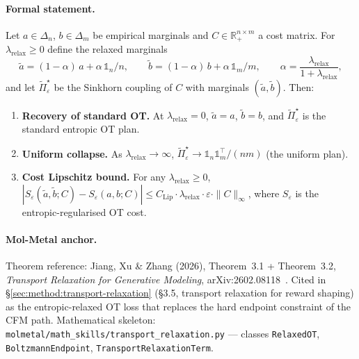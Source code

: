 \paragraph{Formal statement.}
\begin{theorem}
\label{thm:T2-transport-relax}
Let $a \in \Delta_n$, $b \in \Delta_m$ be empirical marginals and
$C \in \mathbb{R}^{n \times m}_{+}$ a cost matrix.  For
$\lambda_{\mathrm{relax}} \geq 0$ define the relaxed marginals
\[
  \tilde a = (1 - \alpha) \, a + \alpha \, \mathbb{1}_n / n, \qquad
  \tilde b = (1 - \alpha) \, b + \alpha \, \mathbb{1}_m / m, \qquad
  \alpha = \frac{\lambda_{\mathrm{relax}}}{1 + \lambda_{\mathrm{relax}}},
\]
and let $\tilde \Pi^{\star}_{\varepsilon}$ be the Sinkhorn coupling
of $C$ with marginals $(\tilde a, \tilde b)$.  Then:
\begin{enumerate}
  \item[(i)] \textbf{Recovery of standard OT.}  At
    $\lambda_{\mathrm{relax}} = 0$, $\tilde a = a$, $\tilde b = b$,
    and $\tilde \Pi^{\star}_{\varepsilon}$ is the standard
    entropic OT plan.
  \item[(ii)] \textbf{Uniform collapse.}  As
    $\lambda_{\mathrm{relax}} \to \infty$, $\tilde \Pi^{\star}_{\varepsilon}
    \to \mathbb{1}_n \mathbb{1}_m^{\top} / (n m)$ (the uniform plan).
  \item[(iii)] \textbf{Cost Lipschitz bound.}  For any
    $\lambda_{\mathrm{relax}} \geq 0$,
    $|S_\varepsilon(\tilde a, \tilde b; C) - S_\varepsilon(a, b; C)|
      \le C_{\mathrm{Lip}} \cdot \lambda_{\mathrm{relax}} \cdot
      \varepsilon \cdot \|C\|_{\infty}$,
    where $S_\varepsilon$ is the entropic-regularised OT cost.
\end{enumerate}
\end{theorem}

\paragraph{Mol-Metal anchor.}
Theorem reference: Jiang, Xu \& Zhang (2026), Theorem~3.1 +
Theorem~3.2, \emph{Transport Relaxation for Generative Modeling},
arXiv:2602.08118~\cite{jiang2026sb_relax}.  Cited in
\S\ref{sec:method:transport-relaxation} (\S3.5, transport
relaxation for reward shaping) as the entropic-relaxed OT loss
that replaces the hard endpoint constraint of the CFM path.
Mathematical skeleton:
\texttt{molmetal/math\_skills/transport\_relaxation.py} ---
classes \texttt{RelaxedOT}, \texttt{BoltzmannEndpoint},
\texttt{TransportRelaxationTerm}.

